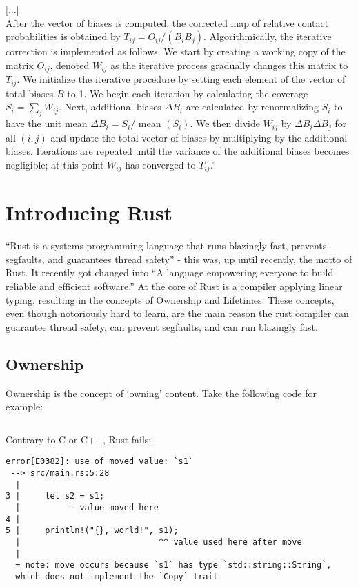 [...] \\
After the vector of biases is computed, the corrected map of relative
contact probabilities is obtained by $T_{ij} = O_{ij} / (B_i B_j)$.
Algorithmically, the iterative correction is implemented as follows. We start
by creating a working copy of the matrix $O_{ij}$, denoted $W_{ij}$ as the
iterative process gradually changes this matrix to $T_{ij}$. We initialize the
iterative procedure by setting each element of the vector of total biases $B$
to 1. We begin each iteration by calculating the coverage $S_i = \sum_j
W_{ij}$. Next, additional biases $\Delta B_i$ are calculated by renormalizing
$S_i$ to have the unit mean $\Delta B_i = S_i /$ mean $(S_i)$. We then divide
$W_{ij}$ by $\Delta B_i \Delta B_j$ for all $(i, j)$ and update the total
vector of biases by multiplying by the additional biases. Iterations are
repeated until the variance of the additional biases becomes negligible; at
this point $W_{ij}$ has converged to $T_{ij}$.''




\section{Introducing Rust}\label{sec:Rust}


``Rust is a systems programming language that runs blazingly fast, prevents
segfaults, and guarantees thread safety'' - this was, up until recently, the
motto of Rust. It recently got changed into ``A language empowering everyone
to build reliable and efficient software.'' At the core of Rust is a compiler
applying linear typing, resulting in the concepts of Ownership and Lifetimes.
These concepts, even though notoriously hard to learn, are the main reason the
rust compiler can guarantee thread safety, can prevent segfaults, and can run
blazingly fast.

\subsection{Ownership}

Ownership is the concept of `owning' content. Take the following code for
example:
\inputminted{Rust}{code_ownership.rs}

Contrary to C or C++, Rust fails:

\begin{verbatim}
error[E0382]: use of moved value: `s1`
 --> src/main.rs:5:28
  |
3 |     let s2 = s1;
  |         -- value moved here
4 |
5 |     println!("{}, world!", s1);
  |                            ^^ value used here after move
  |
  = note: move occurs because `s1` has type `std::string::String`,
  which does not implement the `Copy` trait
\end{verbatim}

